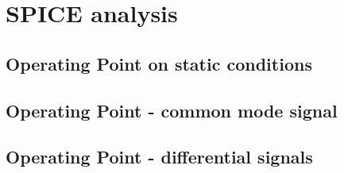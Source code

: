 \documentclass[10pt,a4paper]{book}
\begin{document}
\clearpage
\section{SPICE analysis}
\subsection{Operating Point on static conditions}



\subsection{Operating Point - common mode signal}



\subsection{Operating Point - differential signals}


\end{document}
